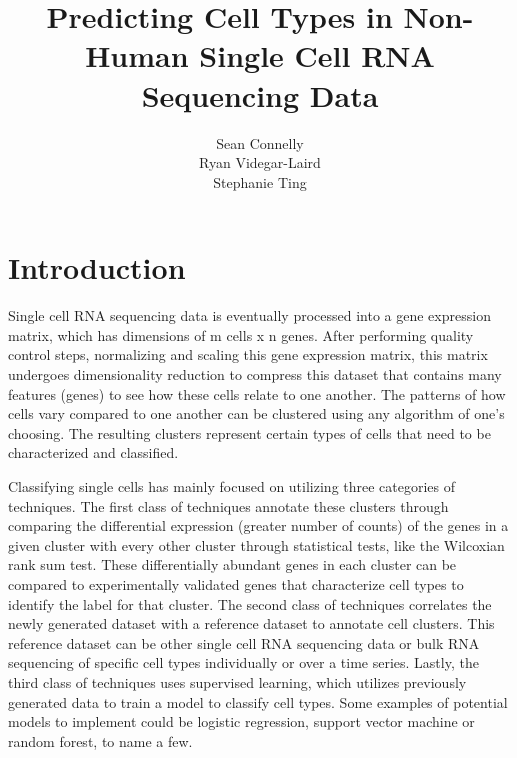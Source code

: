 \documentclass{article}
\title{Predicting Cell Types in Non-Human Single Cell RNA Sequencing Data}
\author{
  Sean Connelly \\
  \And
  Ryan Videgar-Laird \\
  \AND
  Stephanie Ting \\
}
\begin{document}
\maketitle

\section{Introduction}
\label{intro}

Single cell RNA sequencing data is eventually processed into a gene expression matrix, which has dimensions of m cells x n genes. After performing quality control steps, normalizing and scaling this gene expression matrix, this matrix undergoes dimensionality reduction to compress this dataset that contains many features (genes) to see how these cells relate to one another. The patterns of how cells vary compared to one another can be clustered using any algorithm of one’s choosing. The resulting clusters represent certain types of cells that need to be characterized and classified.

Classifying single cells has mainly focused on utilizing three categories of techniques. The first class of techniques annotate these clusters through comparing the differential expression (greater number of counts) of the genes in a given cluster with every other cluster through statistical tests, like the Wilcoxian rank sum test. These differentially abundant genes in each cluster can be compared to experimentally validated genes that characterize cell types to identify the label for that cluster. The second class of techniques correlates the newly generated dataset with a reference dataset to annotate cell clusters. This reference dataset can be other single cell RNA sequencing data or bulk RNA sequencing of specific cell types individually or over a time series. Lastly, the third class of techniques uses supervised learning, which utilizes previously generated data to train a model to classify cell types. Some examples of potential models to implement could be logistic regression, support vector machine or random forest, to name a few.
\end{document}
